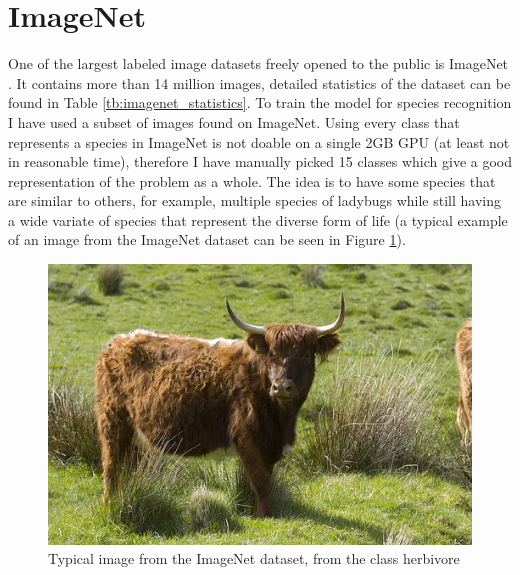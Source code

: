 \documentclass[times, utf8, diplomski]{fer}
\begin{document}
\section{ImageNet}
\label{se:imagenet}

One of the largest labeled image datasets freely opened to the public is ImageNet \citep{imagenet}. It contains more than 14 million images, detailed statistics of the dataset can be found in Table \ref{tb:imagenet_statistics}. To train the model for species recognition I have used a subset of images found on ImageNet. Using every class that represents a species in ImageNet is not doable on a single 2GB GPU (at least not in reasonable time), therefore I have manually picked 15 classes which give a good representation of the problem as a whole. The idea is to have some species that are similar to others, for example, multiple species of ladybugs while still having a wide variate of species that represent the diverse form of life (a typical example of an image from the ImageNet dataset can be seen in Figure \ref{fig:typical_imagenet_example}).

\begin{figure}
  \includegraphics[scale=0.55]{figures/typical_imagenet.jpg}
  \centering
  \caption{Typical image from the ImageNet dataset, from the class herbivore}
  \label{fig:typical_imagenet_example}
\end{figure}
\end{document}
